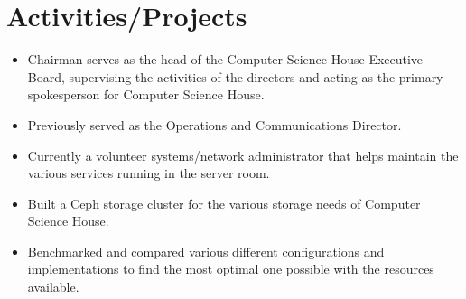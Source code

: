 \documentclass[]{deedy-resume-openfont}
\begin{document}
\begin{minipage}[t]{0.66\textwidth}
\vspace{-4mm}
\section{Activities/Projects}
\vspace{-3.5mm}
\begin{itemize}
  \itemsep-3pt
  \item Chairman serves as the head of the Computer Science House Executive Board, supervising the activities of the directors and acting as the primary spokesperson for Computer Science House.
  \item Previously served as the Operations and Communications Director.
  \item Currently a volunteer systems/network administrator that helps maintain the various services running in the server room.
\end{itemize}
\sectionsep

\vspace{-5.5mm}

\vspace{-3mm}
\begin{itemize}
  \itemsep-4pt
  \item Built a Ceph storage cluster for the various storage needs of Computer Science House.
  \item Benchmarked and compared various different configurations and implementations to find the most optimal one possible with the resources available.
\end{itemize}
\vspace{-5.5mm}
\sectionsep


\end{minipage}
\end{document}
